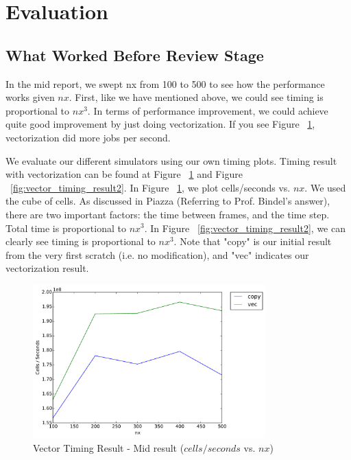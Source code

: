 \section{Evaluation}\label{sec:evaluation}

\subsection{What Worked Before Review Stage}
In the mid report, we swept nx from 100 to 500 to see how the performance works
given $nx$. First, like we have mentioned above, we could see timing is
proportional to $ nx^{3} $. In terms of performance improvement, we could
achieve quite good improvement by just doing vectorization. If you see Figure
~\ref{fig:vector_timing_result1}, vectorization did more jobs per second.

We evaluate our different simulators using our own timing plots. Timing result
with vectorization can be found at Figure ~\ref{fig:vector_timing_result1} and
Figure ~\ref{fig:vector_timing_result2}. In Figure
~\ref{fig:vector_timing_result1}, we plot cells/seconds vs. $nx$. We used the
cube of cells. As discussed in Piazza (Referring to Prof. Bindel's answer),
there are two important factors: the time between frames, and the time step.
Total time is proportional to $ nx^{3} $. In Figure
~\ref{fig:vector_timing_result2}, we can clearly see timing is proportional to
$ nx^{3} $. Note that "copy" is our initial result from the very first scratch
(i.e. no modification), and "vec" indicates our vectorization result.

\begin{figure}[h]
    \centering
    \includegraphics[width=0.8\textwidth]{figs/vec-timing1.pdf}
    \caption{Vector Timing Result - Mid result ($cells/seconds$ vs. $nx$)}
    \label{fig:vector_timing_result1}
\end{figure}

